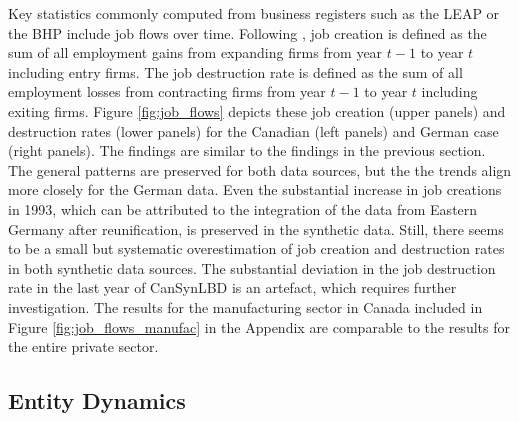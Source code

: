 Key statistics commonly computed from business registers such as the LEAP or the BHP include job flows over time. Following \citet{DavisHaltiwangerSchuh}, job creation is defined as the sum of all employment gains from expanding firms from year $t-1$ to year $t$ including entry firms. The job destruction rate is defined as the sum of all employment losses from contracting firms from year $t-1$ to year $t$ including exiting firms. Figure \ref{fig:job_flows} depicts these job creation (upper panels) and destruction rates (lower panels) for the Canadian (left panels) and German case (right panels). The findings are similar to the findings in the previous section. The general patterns are preserved for both data sources, but the the trends align more closely for the German data. Even the substantial increase in job creations in 1993, which can be attributed to the integration of the data from Eastern Germany after reunification, is preserved in the synthetic data. Still, there seems to be a small but systematic overestimation of job creation and destruction rates in both synthetic data sources. The substantial deviation in the job destruction rate in the last year of CanSynLBD is an artefact, which requires further investigation. 
The results for the manufacturing sector in Canada included in Figure \ref{fig:job_flows_manufac} in the Appendix are comparable to the results for the entire private sector.




\subsection{Entity Dynamics}

